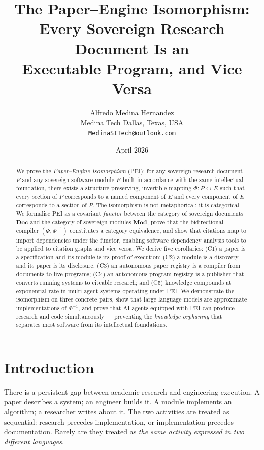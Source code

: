 \documentclass[12pt]{article}
\title{\textbf{The Paper--Engine Isomorphism: \\
  Every Sovereign Research Document Is an \\
  Executable Program, and Vice Versa}}
\author{Alfredo Medina Hernandez \\
  \normalsize Medina Tech \quad Dallas, Texas, USA \\
  \normalsize \texttt{MedinaSITech@outlook.com}}
\date{April 2026}
\begin{document}
\maketitle

\begin{abstract}
We prove the \emph{Paper--Engine Isomorphism} (PEI): for any sovereign
research document $P$ and any sovereign software module $E$ built in accordance
with the same intellectual foundation, there exists a structure-preserving,
invertible mapping $\Phi: P \leftrightarrow E$ such that every section of $P$
corresponds to a named component of $E$ and every component of $E$ corresponds
to a section of $P$.  The isomorphism is not metaphorical; it is categorical.
We formalise PEI as a covariant \emph{functor} between the category of sovereign
documents $\mathbf{Doc}$ and the category of sovereign modules $\mathbf{Mod}$,
prove that the bidirectional compiler $(\Phi, \Phi^{-1})$ constitutes a
category equivalence, and show that citations map to import dependencies
under the functor, enabling software dependency analysis tools to be applied
to citation graphs and vice versa.  We derive five corollaries: (C1) a paper
is a specification and its module is its proof-of-execution; (C2) a module is
a discovery and its paper is its disclosure; (C3) an autonomous paper registry
is a compiler from documents to live programs; (C4) an autonomous program
registry is a publisher that converts running systems to citeable research;
and (C5) knowledge compounds at exponential rate in multi-agent systems
operating under PEI.  We demonstrate the isomorphism on three concrete pairs,
show that large language models are approximate implementations of $\Phi^{-1}$,
and prove that AI agents equipped with PEI can produce research and code
simultaneously — preventing the \emph{knowledge orphaning} that separates most
software from its intellectual foundations.
\end{abstract}

\section{Introduction}
\label{sec:intro}

There is a persistent gap between academic research and engineering execution.
A paper describes a system; an engineer builds it.  A module implements an
algorithm; a researcher writes about it.  The two activities are treated as
sequential: research precedes implementation, or implementation precedes
documentation.  Rarely are they treated as \emph{the same activity expressed
in two different languages}.
\end{document}
